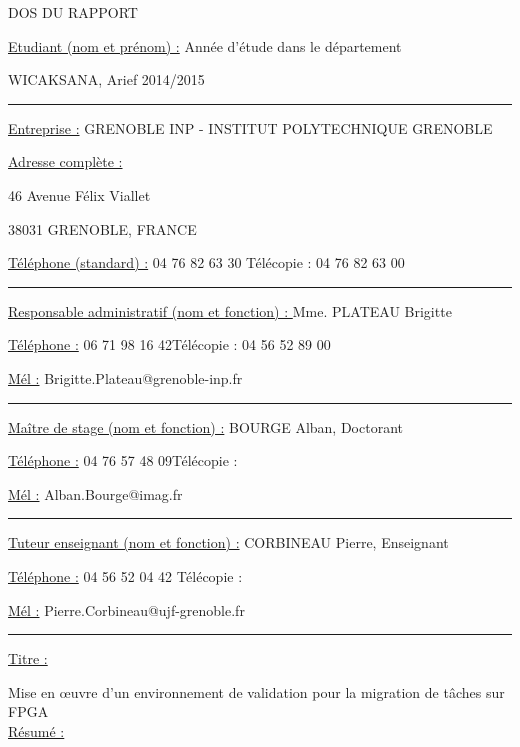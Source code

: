 \documentclass[a4paper,12pt,oneside,final,oldfontcommands]{memoir}
\begin{document}
\SingleSpacing
{}
\centering
\begin{bfseries}
DOS DU RAPPORT

\begin{itshape}
\justify
\setlength{\parindent}{0pt}
\underline{Etudiant (nom et prénom) :} \hfill Année d'étude dans le département

WICAKSANA, Arief \hfill 2014/2015

\rule{\textwidth}{1pt}

\underline{Entreprise :} GRENOBLE INP - INSTITUT POLYTECHNIQUE GRENOBLE

\underline{Adresse complète :}

46 Avenue Félix Viallet

38031 GRENOBLE, FRANCE 

\underline{Téléphone (standard) :} 04 76 82 63 30 \hfill Télécopie : 04 76 82 63 00

\rule{\textwidth}{1pt}

\underline{Responsable administratif (nom et fonction) : } Mme. PLATEAU Brigitte

\underline{Téléphone :} 06 71 98 16 42\hfill Télécopie : 04 56 52 89 00

\underline{Mél :} Brigitte.Plateau@grenoble-inp.fr

\rule{\textwidth}{1pt}

\underline{Maître de stage (nom et fonction) :} BOURGE Alban, Doctorant

\underline{Téléphone :} 04 76 57 48 09\hfill Télécopie :  \hspace{26 mm}

\underline{Mél :} Alban.Bourge@imag.fr

\rule{\textwidth}{1pt}

\underline{Tuteur enseignant (nom et fonction) :} CORBINEAU Pierre, Enseignant

\underline{Téléphone :} 04 56 52 04 42  \hfill Télécopie : \hspace{26 mm}

\underline{Mél :} Pierre.Corbineau@ujf-grenoble.fr

\rule{\textwidth}{1pt}

\underline{Titre :}

Mise en œuvre d'un environnement de validation pour la migration de tâches sur FPGA \\

\underline{Résumé :}

\end{itshape}

\end{bfseries}
\end{document}
